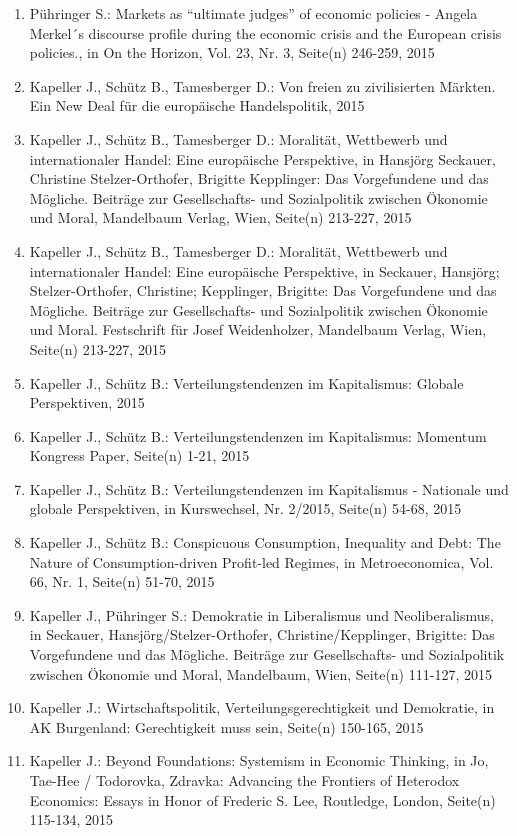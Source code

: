 \begin{enumerate}
	 \item Pühringer S.: Markets as “ultimate judges” of economic policies - Angela Merkel´s discourse profile during the economic crisis and the European crisis policies., in On the Horizon, Vol. 23, Nr. 3, Seite(n) 246-259, 2015
	 \item Kapeller J., Schütz B., Tamesberger D.: Von freien zu zivilisierten Märkten. Ein New Deal für die europäische Handelspolitik, 2015
	 \item Kapeller J., Schütz B., Tamesberger D.: Moralität, Wettbewerb und internationaler Handel: Eine europäische Perspektive, in Hansjörg Seckauer, Christine Stelzer-Orthofer, Brigitte Kepplinger: Das Vorgefundene und das Mögliche. Beiträge zur Gesellschafts- und Sozialpolitik zwischen Ökonomie und Moral, Mandelbaum Verlag, Wien, Seite(n) 213-227, 2015
	 \item Kapeller J., Schütz B., Tamesberger D.: Moralität, Wettbewerb und internationaler Handel: Eine europäische Perspektive, in Seckauer, Hansjörg; Stelzer-Orthofer, Christine; Kepplinger, Brigitte: Das Vorgefundene und das Mögliche. Beiträge zur Gesellschafts- und Sozialpolitik zwischen Ökonomie und Moral. Festschrift für Josef Weidenholzer, Mandelbaum Verlag, Wien, Seite(n) 213-227, 2015
	 \item Kapeller J., Schütz B.: Verteilungstendenzen im Kapitalismus: Globale Perspektiven, 2015
	 \item Kapeller J., Schütz B.: Verteilungstendenzen im Kapitalismus: Momentum Kongress Paper, Seite(n) 1-21, 2015
	 \item Kapeller J., Schütz B.: Verteilungstendenzen im Kapitalismus - Nationale und globale Perspektiven, in Kurswechsel, Nr. 2/2015, Seite(n) 54-68, 2015
	 \item Kapeller J., Schütz B.: Conspicuous Consumption, Inequality and Debt: The Nature of Consumption-driven Profit-led Regimes, in Metroeconomica, Vol. 66, Nr. 1, Seite(n) 51-70, 2015
	 \item Kapeller J., Pühringer S.: Demokratie in Liberalismus und Neoliberalismus, in Seckauer, Hansjörg/Stelzer-Orthofer, Christine/Kepplinger, Brigitte: Das Vorgefundene und das Mögliche. Beiträge zur Gesellschafts- und Sozialpolitik zwischen Ökonomie und Moral, Mandelbaum, Wien, Seite(n) 111-127, 2015
	 \item Kapeller J.: Wirtschaftspolitik, Verteilungsgerechtigkeit und Demokratie, in AK Burgenland: Gerechtigkeit muss sein, Seite(n) 150-165, 2015
	 \item Kapeller J.: Beyond Foundations: Systemism in Economic  Thinking, in Jo, Tae-Hee / Todorovka, Zdravka: Advancing the Frontiers of Heterodox Economics: Essays in Honor of Frederic S. Lee, Routledge, London, Seite(n) 115-134, 2015

\end{enumerate}
